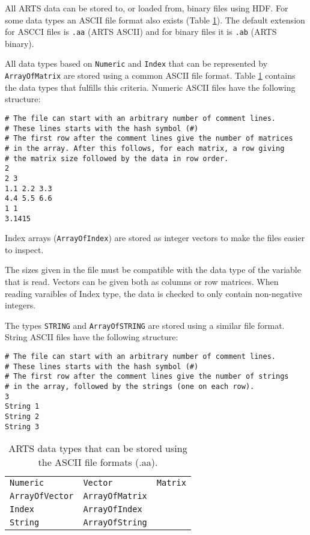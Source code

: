  \label{sec:formats:files}
 
 All ARTS data can be stored to, or loaded from, binary files using
 HDF.  For some data types an ASCII file format also exists (Table
 \ref{table:format:aa}). The default extension for ASCCI files is
 \verb|.aa| (ARTS ASCII) and for binary files it is \verb|.ab| (ARTS
 binary).
 
  \label{sec:formats:file:ascii}
  
  All data types based on \verb|Numeric| and \verb|Index| that can be
  represented by \verb|ArrayOfMatrix| are stored using a common ASCII
  file format. Table \ref{table:format:aa} contains the data types that
  fulfills this criteria. Numeric ASCII files have the following 
  structure: \\
  {\footnotesize \begin{verbatim} 
# The file can start with an arbitrary number of comment lines.  
# These lines starts with the hash symbol (#) 
# The first row after the comment lines give the number of matrices 
# in the array. After this follows, for each matrix, a row giving 
# the matrix size followed by the data in row order.  
2 
2 3 
1.1 2.2 3.3 
4.4 5.5 6.6 
1 1 
3.1415
 \end{verbatim} 
}

 \noindent
 Index arrays (\verb|ArrayOfIndex|) are stored as integer vectors to
 make the files easier to inspect.
     
 The sizes given in the file must be compatible with the data type
 of the variable that is read. Vectors can be given both as
 columns or row matrices. When reading varaibles of Index type,
 the data is checked to only contain non-negative integers.
 
 The types \verb|STRING| and \verb|ArrayOfSTRING| are stored using a
 similar file format. String ASCII files have the following structure:
 {\footnotesize \begin{verbatim} 
# The file can start with an arbitrary number of comment lines.
# These lines starts with the hash symbol (#)
# The first row after the comment lines give the number of strings
# in the array, followed by the strings (one on each row).  
3
String 1
String 2
String 3
 \end{verbatim} 
}

 \begin{table}[t]
  \begin{tabular}{p{4cm} p{4cm} p{4cm}}
   \verb|Numeric|        & \verb|Vector|         & \verb|Matrix|          \\
   \verb|ArrayOfVector|  & \verb|ArrayOfMatrix|  &                        \\
   \verb|Index|          & \verb|ArrayOfIndex|  &                        \\
   \verb|String|          & \verb|ArrayOfString|  &                        \\
  \end{tabular}
  \caption{ARTS data types that can be stored using the ASCII
           file formats (.aa).}
  \label{table:format:aa}
 \end{table}
 


